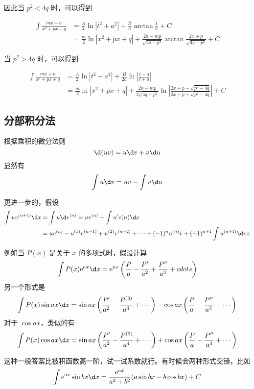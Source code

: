 因此当 $p^2<4q$ 时，可以得到

\begin{equation*}
    \begin{aligned}
        \int \frac{mx+n}{x^2+px+q} &= \frac{A}{2} \ln|t^2 + a^2| + \frac{B}{a}\arctan\frac{t}{a} + C\\
        &=\frac{m}{2}\ln|x^2+px+q| + \frac{2n-mp}{\sqrt{4q-p^2}}\arctan{\frac{2x+p}{\sqrt{4q-p^2}}} + C
    \end{aligned}
\end{equation*}

当 $p^2>4q$ 时，可以得到

\begin{equation*}
    \begin{aligned}
        \int \frac{mx+n}{x^2+px+q} &= \frac{A}{2} \ln|t^2 - a^2| + \frac{B}{2a}\ln\left|\frac{t-a}{t+a}\right|\\
        &=\frac{m}{2}\ln|x^2+px+q| + \frac{2n-mp}{2\sqrt{4q-p^2}}\ln\left| \frac{2x+p-\sqrt{p^2-4q}}{2x+p+\sqrt{p^2-4q}} \right| + C
    \end{aligned}
\end{equation*}

\subsection{分部积分法}

根据乘积的微分法则
\[ \d(uv) = u \d v + v \d u \]
显然有
\[ \int u \d v = uv - \int v \d u \]

更进一步的，假设
\[ \begin{aligned}
  \int u v^{(n+1)} \d x &= \int u \d v^{(n)} = uv^{(n)} - \int u' v(n) \d x \\
  &= u v^{(n)} - u^{(1)} v^{(n-1)} + u^{(2)} v^{(n-2)} + \cdots + (-1)^n u^{(n)} v + (-1)^{n+1} \int u^{(n+1)} \d v x
\end{aligned} \]

例如当 $P(x)$ 是关于 $x$ 的多项式时，假设计算
\[ \int P(x) \ee^{ax} \d x = \ee^{ax} \left( \frac{P}{a} - \frac{P'}{a^2} + \frac{P''}{a^3} + cdots \right) \]
另一个形式是
\[ \int P(x) \sin ax \d x = \sin ax \left( \frac{P'}{a^2} - \frac{P^{(3)}}{a^4} + \cdots  \right) - \cos ax \left( \frac{P}{a} - \frac{P''}{a^3} + \cdots \right) \]
对于 $\cos ax$，类似的有
\[ \int P(x) \cos ax \d x = \sin ax \left( \frac{P'}{a^2} - \frac{P^{(3)}}{a^4} + \cdots  \right) + \cos ax \left( \frac{P}{a} - \frac{P''}{a^3} + \cdots \right) \]

这种一般答案比被积函数高一阶，试一试系数就行。有时候会两种形式交错，比如
\[ \int \ee^{ax} \sin bx \d x = \frac{\ee^{ax}}{a^2+b^2} (a \sin bx - b \cos bx) + C\]


